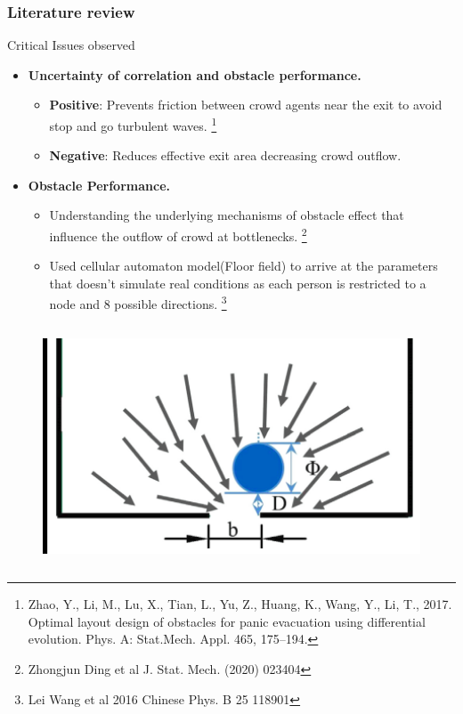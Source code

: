 \documentclass{beamer}
\begin{document}
\begin{frame}	\frametitle{Literature review}
	Critical Issues observed
	\begin{itemize}
		\item \textbf{Uncertainty of correlation and obstacle performance.}
		\begin{itemize}\scriptsize
			\item \textbf{Positive}: Prevents friction between crowd agents near the exit to avoid stop and go turbulent waves.
			\footnote[frame]{\tiny Zhao, Y., Li, M., Lu, X., Tian, L., Yu, Z., Huang, K., Wang, Y., Li, T., 2017. Optimal layout design of obstacles for panic evacuation using differential evolution. Phys. A: Stat.Mech. Appl. 465, 175–194.}
			\item \textbf{Negative}: Reduces effective exit area decreasing crowd outflow.
		\end{itemize}
		\item \textbf{Obstacle Performance.}
		\begin{itemize}\scriptsize
			\item Understanding the underlying mechanisms of obstacle effect that influence the outflow of crowd at bottlenecks.			\footnote[frame]{\tiny Zhongjun Ding et al J. Stat. Mech. (2020) 023404}
			\item Used cellular automaton model(Floor field) to arrive at the parameters that doesn't simulate real conditions as each person is restricted to a node and 8 possible directions.
			\footnote[frame]{\tiny Lei Wang et al 2016 Chinese Phys. B 25 118901}
		\end{itemize}
	\end{itemize}
\begin{columns}
\begin{column}{0.3\textwidth}
    \begin{figure}
    \centering
        \includegraphics[width=1\textwidth]{obstacle_performanc.png}

\end{figure}
\end{column}
\end{columns}
\end{frame}
\end{document}

